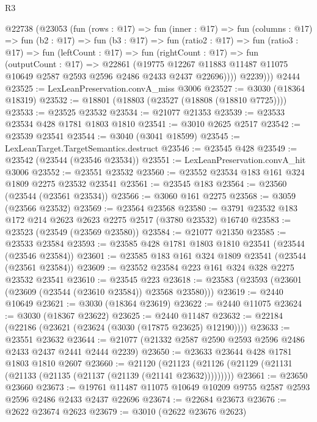 \begin{lexlean}{R3}
\begin{coremodule}
        @22738
          (@23053
            (fun (rows : @17) =>
            fun (inner : @17) =>
            fun (columns : @17) =>
            fun (b2 : @17) =>
            fun (b3 : @17) =>
            fun (ratio2 : @17) =>
            fun (ratio3 : @17) =>
            fun (leftCount : @17) =>
            fun (rightCount : @17) =>
            fun (outputCount : @17) =>
            @22861
              (@19775
                @12267
                @11883
                @11487
                @11075
                @10649
                @2587
                @2593
                @2596
                @2486
                @2433
                @2437
                @22696))))
          @2239)))
    @2444
@23525 := LexLeanPreservation.convA_miss @3006
@23527 := @3030 (@18364 @18319)
@23532 := @18801 (@18803 (@23527 (@18808 (@18810 @7725))))
@23533 := @23525 @23532
@23534 := @21077 @21353
@23539 := @23533 @23534 @428 @1781 @1803 @1810
@23541 := @3010 @2625 @2517
@23542 := @23539 @23541
@23544 := @3040 (@3041 @18599)
@23545 := LexLeanTarget.TargetSemantics.destruct
@23546 := @23545 @428
@23549 := @23542 (@23544 (@23546 @23534))
@23551 := LexLeanPreservation.convA_hit @3006
@23552 := @23551 @23532
@23560 := @23552 @23534 @183 @161 @324 @1809 @2275 @23532 @23541
@23561 := @23545 @183
@23564 := @23560 (@23544 (@23561 @23534))
@23566 := @3060 @161 @2275
@23568 := @3059 (@23566 @23532)
@23569 := @23564 @23568
@23580 := @3791 @23532 @183 @172 @214 @2623 @2623 @2275 @2517 (@3780 @23532) @16740
@23583 := @23523 (@23549 (@23569 @23580))
@23584 := @21077 @21350
@23585 := @23533 @23584
@23593 := @23585 @428 @1781 @1803 @1810 @23541 (@23544 (@23546 @23584))
@23601 := @23585 @183 @161 @324 @1809 @23541 (@23544 (@23561 @23584))
@23609 := @23552 @23584 @223 @161 @324 @328 @2275 @23532 @23541
@23610 := @23545 @223
@23618 := @23583 (@23593 (@23601 (@23609 (@23544 (@23610 @23584)) @23568 @23580)))
@23619 := @2440 @10649
@23621 := @3030 (@18364 @23619)
@23622 := @2440 @11075
@23624 := @3030 (@18367 @23622)
@23625 := @2440 @11487
@23632 := @22184 (@22186 (@23621 (@23624 (@3030 (@17875 @23625) @12190))))
@23633 := @23551 @23632
@23644 := @21077 (@21332 @2587 @2590 @2593 @2596 @2486 @2433 @2437 @2441 @2444 @2239)
@23650 := @23633 @23644 @428 @1781 @1803 @1810 @2607
@23660 := @21120
    (@21123 (@21126 (@21129 (@21131 (@21133 (@21135 (@21137 (@21139 (@21141 @23632)))))))))
@23661 := @23650 @23660
@23673 := @19761 @11487 @11075 @10649 @10209 @9755 @2587 @2593 @2596 @2486 @2433 @2437 @22696
@23674 := @22684 @23673
@23676 := @2622 @23674 @2623
@23679 := @3010 (@2622 @23676 @2623)

\end{coremodule}
\end{lexlean}
